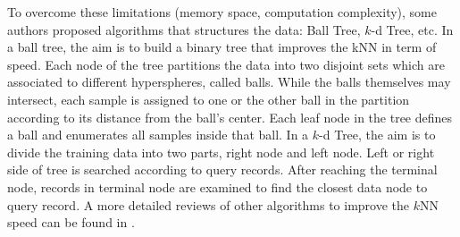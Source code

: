 To overcome these limitations (memory space, computation complexity), some authors proposed algorithms that structures the data:  Ball Tree, $k$-d Tree, etc. In a ball tree, the aim is to build a binary tree that improves the kNN in term of speed. Each node of the tree partitions the data into two disjoint sets which are associated to different hyperspheres, called balls. While the balls themselves may intersect, each sample is assigned to one or the other ball in the partition according to its distance from the ball's center. Each leaf node in the tree defines a ball and enumerates all samples inside that ball. In a $k$-d Tree, the aim is to divide the training data into two parts, right node and left node. Left or right side of tree is searched according to query records. After reaching the terminal node, records in terminal node are examined to find the closest data node to query record. A more detailed reviews of other algorithms to improve the $k$NN speed can be found in \cite{Bhatia2010}.



